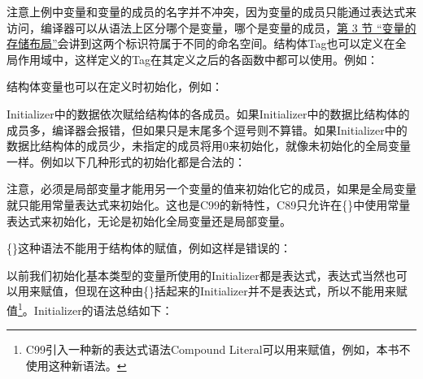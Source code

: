 


注意上例中变量和变量的成员的名字并不冲突，因为变量的成员只能通过表达式来访问，编译器可以从语法上区分哪个是变量，哪个是变量的成员，\hyperlink{db.ch19s03.id2777491}{第 3 节 “变量的存储布局”}会讲到这两个标识符属于不同的命名空间。结构体Tag也可以定义在全局作用域中，这样定义的Tag在其定义之后的各函数中都可以使用。例如：




结构体变量也可以在定义时初始化，例如：




Initializer中的数据依次赋给结构体的各成员。如果Initializer中的数据比结构体的成员多，编译器会报错，但如果只是末尾多个逗号则不算错。如果Initializer中的数据比结构体的成员少，未指定的成员将用0来初始化，就像未初始化的全局变量一样。例如以下几种形式的初始化都是合法的：




注意，必须是局部变量才能用另一个变量的值来初始化它的成员，如果是全局变量就只能用常量表达式来初始化。这也是C99的新特性，C89只允许在\{\}中使用常量表达式来初始化，无论是初始化全局变量还是局部变量。



\{\}这种语法不能用于结构体的赋值，例如这样是错误的：




以前我们初始化基本类型的变量所使用的Initializer都是表达式，表达式当然也可以用来赋值，但现在这种由\{\}括起来的Initializer并不是表达式，所以不能用来赋值\footnote[14]{C99引入一种新的表达式语法Compound Literal可以用来赋值，例如，本书不使用这种新语法。}。Initializer的语法总结如下：


\begin{BookLiteral}
\end{BookLiteral}


